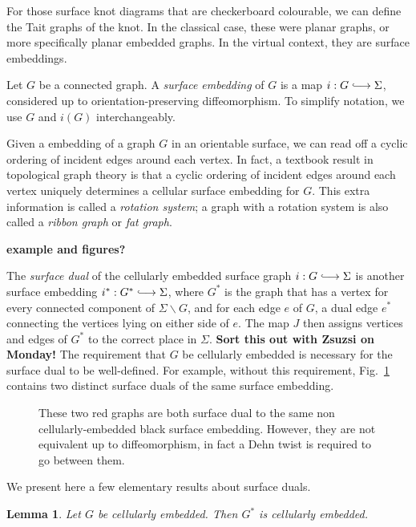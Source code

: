 \documentclass[12pt]{report}
\newcommand{\inject}{\lhook\joinrel\longrightarrow}
\newcommand{\notered}[1]{{\color{Red} \textbf{#1}}}
\newtheorem*{lemma}{Lemma}
\theoremstyle{upright}
\begin{document}
For those surface knot diagrams that are checkerboard colourable, we can define the Tait graphs of the knot. In the classical case, these were planar graphs, or more specifically planar embedded graphs. In the virtual context, they are surface embeddings.

Let $G$ be a connected graph. A \textit{surface embedding} of $G$ is a map $i: G \inject \Sigma$, considered up to orientation-preserving diffeomorphism. To simplify notation, we use $G$ and $i(G)$ interchangeably.

Given a embedding of a graph $G$ in an orientable surface, we can read off a cyclic ordering of incident edges around each vertex. In fact, a textbook result in topological graph theory is that a cyclic ordering of incident edges around each vertex uniquely determines a cellular surface embedding for $G$\cite[Theorem 3.2.4]{graphs-on-surfaces}. This extra information is called a \textit{rotation system}; a graph with a rotation system is also called a \textit{ribbon graph} or \textit{fat graph}.

\notered{example and figures?}

The \textit{surface dual} of the cellularly embedded surface graph $i: G \inject \Sigma$ is another surface embedding $i^{*}: G^{*} \inject \Sigma$, where $G^{*}$ is the graph that has a vertex for every connected component of  $\Sigma \smallsetminus G$, and for each edge $e$ of $G$, a dual edge $e^{\ast}$ connecting the vertices lying on either side of $e$. The map $J$ then assigns vertices and edges of $G^{*}$ to the correct place in $\Sigma$. \notered{Sort this out with Zsuzsi on Monday!} The requirement that $G$ be cellularly embedded is necessary for the surface dual to be well-defined. For example, without this requirement, Fig.~\ref{fig:multiple_dual_graphs} contains two distinct surface duals of the same surface embedding.

\begin{figure}[hbt!]
	\centering
	\def\svgscale{0.45}
	
	
	\caption{These two red graphs are both surface dual to the same non cellularly-embedded black surface embedding. However, they are not equivalent up to diffeomorphism, in fact a Dehn twist is required to go between them.}
	\label{fig:multiple_dual_graphs}
\end{figure}


We present here a few elementary results about surface duals.

\begin{lemma}
Let $G$ be cellularly embedded. Then $G^{*}$ is cellularly embedded.
\end{lemma}
\end{document}
